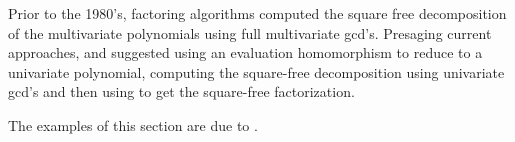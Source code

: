 Prior to the 1980's, factoring algorithms computed the square free
decomposition of the multivariate polynomials using full multivariate
{\sc gcd}'s.  Presaging current approaches, {\Trager} and {\WangP}
\cite{Wang1979-ga} suggested using an evaluation homomorphism to reduce
to a univariate polynomial, computing the square-free decomposition
using univariate {\sc gcd}'s and then using  to
get the square-free factorization.

  The examples of this section are due
to {\Gathen} \cite{Gathen1984-gi,Von_zur_Gathen1985-iz}.


\normalsize
